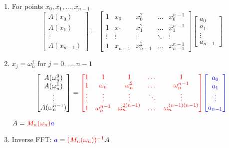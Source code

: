 \documentclass[11pt]{article}
\begin{document}
\begin{enumerate}
    \item For points $x_0, x_1, ..., x_{n-1}$
\[
\begin{bmatrix}
    A(x_0) \\
    A(x_1) \\
    \vdots \\
    A(x_{n-1})
\end{bmatrix}
=
\begin{bmatrix}
    1 & x_0 & x_0^2 & \dots & x_0^{n-1} \\
    1 & x_1 & x_1^2 & \dots & x_1^{n-1} \\
    \vdots & \vdots & \vdots & \ddots & \vdots \\
    1 & x_{n-1} & x_{n-1}^2 & \dots & x_{n-1}^{n-1}
\end{bmatrix}
\begin{bmatrix}
    a_0 \\
    a_1 \\
    \vdots \\
    a_{n-1}
\end{bmatrix}
\]
    \item $x_j=\omega_n^j$ for $j=0,...,n-1$
\[
\begin{bmatrix}
    A(\omega_n^0) \\
    A(\omega_n^1) \\
    \vdots \\
    A(\omega_n^{n-1})
\end{bmatrix}
=
\textcolor{red}{
\begin{bmatrix}
    1 & 1 & 1 & \dots & 1 \\
    1 & \omega_n & \omega_n^2 & \dots & \omega_n^{n-1} \\
    \vdots & \vdots & \vdots & \ddots & \vdots \\
    1 & \omega_n^{n-1} & \omega_n^{2(n-1)} & \dots & \omega_n^{(n-1)(n-1)}
\end{bmatrix}}
\textcolor{blue}{
\begin{bmatrix}
    a_0 \\
    a_1 \\
    \vdots \\
    a_{n-1}
\end{bmatrix}}
\]
\begin{center}
$A=\textcolor{red}{M_n(\omega_n)}\textcolor{blue}{a}$
\end{center}
    \item Inverse FFT: $\textcolor{blue}{a}=\textcolor{red}{(M_n(\omega_n))^{-1}}A$


\end{enumerate}
\end{document}
